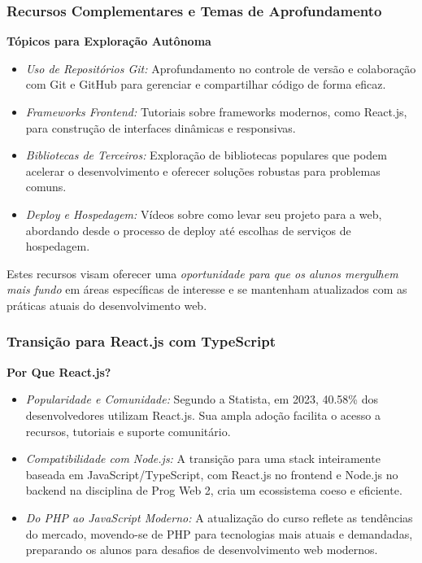 \begin{frame}[fragile]
  \frametitle{Recursos Complementares e Temas de Aprofundamento}
  \textbf{Tópicos para Exploração Autônoma}
  \begin{itemize}
    \item \textit{Uso de Repositórios Git:} Aprofundamento no controle de versão e colaboração com Git e GitHub para gerenciar e compartilhar código de forma eficaz.
    \item \textit{Frameworks Frontend:} Tutoriais sobre frameworks modernos, como React.js, para construção de interfaces dinâmicas e responsivas.
    \item \textit{Bibliotecas de Terceiros:} Exploração de bibliotecas populares que podem acelerar o desenvolvimento e oferecer soluções robustas para problemas comuns.
    \item \textit{Deploy e Hospedagem:} Vídeos sobre como levar seu projeto para a web, abordando desde o processo de deploy até escolhas de serviços de hospedagem.
  \end{itemize}
  Estes recursos visam oferecer uma \textit{oportunidade para que os alunos mergulhem mais fundo} em áreas específicas de interesse e se mantenham atualizados com as práticas atuais do desenvolvimento web.
\end{frame}

\begin{frame}[fragile]
  \frametitle{Transição para React.js com TypeScript}
  \textbf{Por Que React.js?}
  \begin{itemize}
    \item \textit{Popularidade e Comunidade:} Segundo a Statista, em 2023, 40.58\% dos desenvolvedores utilizam React.js. Sua ampla adoção facilita o acesso a recursos, tutoriais e suporte comunitário.
    \item \textit{Compatibilidade com Node.js:} A transição para uma stack inteiramente baseada em JavaScript/TypeScript, com React.js no frontend e Node.js no backend na disciplina de Prog Web 2, cria um ecossistema coeso e eficiente.
    \item \textit{Do PHP ao JavaScript Moderno:} A atualização do curso reflete as tendências do mercado, movendo-se de PHP para tecnologias mais atuais e demandadas, preparando os alunos para desafios de desenvolvimento web modernos.
  \end{itemize}
\end{frame}


